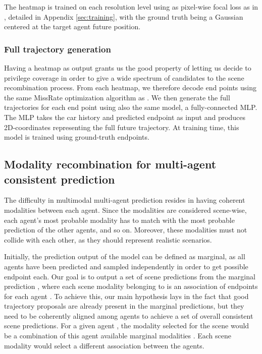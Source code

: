 \documentclass{article} \usepackage{iclr2022_conference,times}
\begin{document}
The heatmap is trained on each resolution level using as pixel-wise focal loss as in \cite{gilles2021home}, detailed in Appendix \ref{sec:training}, with the ground truth being a Gaussian centered at the target agent future position.

\subsubsection{Full trajectory generation} 
Having a heatmap as output grants us the good property of letting us decide to privilege coverage in order to give a wide spectrum of candidates to the scene recombination process.
From each heatmap, we therefore decode  end points using the same MissRate optimization algorithm as \citet{gilles2021home}. We then generate the full trajectories for each end point using also the same model, a fully-connected MLP. The MLP takes the car history and predicted endpoint as input and produces  2D-coordinates representing the full future trajectory. At training time, this model is trained using ground-truth endpoints.

\subsection{Modality recombination for multi-agent consistent prediction}

The difficulty in multimodal multi-agent prediction resides in having coherent modalities between each agent. Since the modalities are considered scene-wise, each agent's most probable modality has to match with the most probable prediction of the other agents, and so on. Moreover, these modalities must not collide with each other, as they should represent realistic scenarios.



















\label{sec:reranking}

Initially, the prediction output of the model can be defined as marginal, as all  agents have been predicted and sampled independently in order to get  possible endpoint each.
Our goal is to output a set of scene predictions  from the marginal prediction , where each scene modality  belonging to  is an association of endpoints  for each agent . To achieve this, our main hypothesis lays in the fact that good trajectory proposals are already present in the marginal predictions, but they need to be coherently aligned among agents to achieve a set of overall consistent scene predictions. For a given agent , the modality selected for the scene  would be a combination of this agent available marginal modalities . Each scene modality  would select a different association between the agents. 
\end{document}
